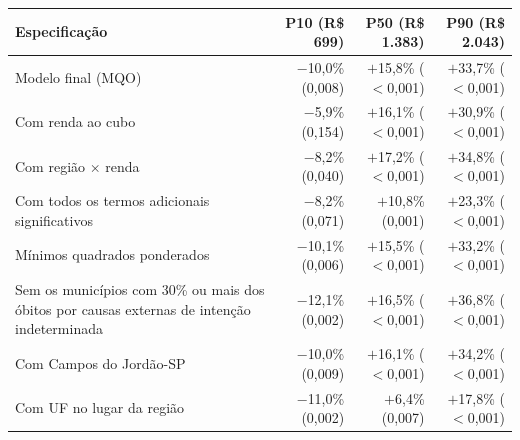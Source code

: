 \begin{tabular}{@{}>{\raggedright\arraybackslash}p{}rrr@{}}
\toprule
\textbf{Especificação} & \textbf{P10 (R\$ 699)} & \textbf{P50 (R\$ 1.383)} & \textbf{P90 (R\$ 2.043)}\\
\midrule
Modelo final (MQO) & $-$10,0\% (0,008) & $+$15,8\% ($<$0,001) & $+$33,7\% ($<$0,001)\\
Com renda ao cubo & $-$5,9\% (0,154) & $+$16,1\% ($<$0,001) & $+$30,9\% ($<$0,001)\\
Com região $\times$ renda & $-$8,2\% (0,040) & $+$17,2\% ($<$0,001) & $+$34,8\% ($<$0,001)\\
Com todos os termos adicionais significativos & $-$8,2\% (0,071) & $+$10,8\% (0,001) & $+$23,3\% ($<$0,001)\\
Mínimos quadrados ponderados & $-$10,1\% (0,006) & $+$15,5\% ($<$0,001) & $+$33,2\% ($<$0,001)\\
Sem os municípios com 30\% ou mais dos óbitos por causas externas de intenção indeterminada & $-$12,1\% (0,002) & $+$16,5\% ($<$0,001) & $+$36,8\% ($<$0,001)\\
Com Campos do Jordão-SP & $-$10,0\% (0,009) & $+$16,1\% ($<$0,001) & $+$34,2\% ($<$0,001)\\
Com UF no lugar da região & $-$11,0\% (0,002) & $+$6,4\% (0,007) & $+$17,8\% ($<$0,001)\\
\bottomrule
\end{tabular}
